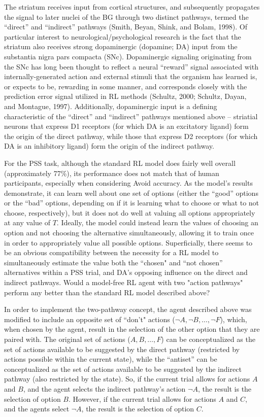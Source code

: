 \documentclass[10pt,letterpaper]{article}
\begin{document}
The striatum receives input from cortical structures, and subsequently propagates the signal to later nuclei of the BG through two distinct pathways, termed the ``direct'' and ``indirect'' pathways (Smith, Beyan, Shink, and Bolam, 1998). Of particular interest to neurological/psychological research is the fact that the striatum also receives strong dopaminergic (dopamine; DA) input from the substantia nigra pars compacta (SNc). Dopaminergic signaling originating from the SNc has long been thought to reflect a neural ``reward'' signal associated with internally-generated action and external stimuli that the organism has learned is, or expects to be, rewarding in some manner, and corresponds closely with the prediction error signal utilized in RL methods (Schultz, 2000; Schultz, Dayan, and Montague, 1997). Additionally, dopaminergic input is a defining characteristic of the ``direct'' and ``indirect'' pathways mentioned above – striatial neurons that express D1 receptors (for which DA is an excitatory ligand) form the origin of the direct pathway, while those that express D2 receptors (for which DA is an inhibitory ligand) form the origin of the indirect pathway.

For the PSS task, although the standard RL model does fairly well overall (approximately 77\%), its performance does not match that of human participants, especially when considering Avoid accuracy. As the model’s results demonstrate, it can learn well about one set of options (either the ``good'' options or the ``bad'' options, depending on if it is learning what to choose or what to not choose, respectively), but it does not do well at valuing all options appropriately at any value of $T$. Ideally, the model could instead learn the values of choosing an option and not choosing the alternative simultaneously, allowing it to train once in order to appropriately value all possible options. Superficially, there seems to be an obvious compatibility between the necessity for a RL model to simultaneously estimate the value both the ``chosen" and ``not chosen'' alternatives within a PSS trial, and DA’s opposing influence on the direct and indirect pathways. Would a model-free RL agent with two "action pathways" perform any better than the standard RL model described above?

In order to implement the two-pathway concept, the agent described above was modified to include an opposite set of ``don't" actions ($\neg A, \neg B, \dots, \neg F$), which, when chosen by the agent, result in the selection of the other option that they are paired with. The original set of actions ($A, B, \dots, F$) can be conceptualized as the set of actions available to be suggested by the direct pathway (restricted by actions possible within the current state), while the ``antiset'' can be conceptualized as the set of actions available to be suggested by the indirect pathway (also restricted by the state). So, if the current trial allows for actions $A$ and $B$, and the agent selects the indirect pathway's action $\neg A$, the result is the selection of option $B$. However, if the current trial allows for actions $A$ and $C$, and the agents select $\neg A$, the result is the selection of option $C$.
\end{document}
